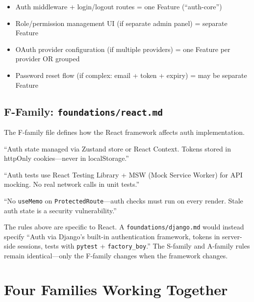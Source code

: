 \documentclass[11pt,a4paper,openright,twoside]{report}
\newcommand{\file}[1]{\texttt{#1}}
\begin{document}
\begin{itemize}[nosep]
  \item Auth middleware + login/logout routes = one Feature (``auth-core'')
  \item Role/permission management UI (if separate admin panel) = separate Feature
  \item OAuth provider configuration (if multiple providers) = one Feature per provider OR grouped
  \item Password reset flow (if complex: email + token + expiry) = may be separate Feature
\end{itemize}

\subsection{F-Family: \file{foundations/react.md}}

The F-family file defines how the React framework affects auth implementation.

\begin{description}[style=nextline, leftmargin=1.8cm, labelwidth=1.4cm]
  \item[F3 --- Implement-time Rules]
  ``Auth state managed via Zustand store or React Context. Tokens stored in httpOnly cookies---never in localStorage.''

  \item[F4 --- Toolchain Commands]
  ``Auth tests use React Testing Library + MSW (Mock Service Worker) for API mocking. No real network calls in unit tests.''

  \item[F7 --- Philosophy]
  ``No \texttt{useMemo} on \texttt{ProtectedRoute}---auth checks must run on every render. Stale auth state is a security vulnerability.''
\end{description}

\begin{warnbox}
The rules above are specific to React. A \file{foundations/django.md} would instead specify ``Auth via Django's built-in authentication framework, tokens in server-side sessions, tests with \texttt{pytest} + \texttt{factory\_boy}.'' The S-family and A-family rules remain identical---only the F-family changes when the framework changes.
\end{warnbox}


\section{Four Families Working Together}
\label{sec:families-collaboration}
\end{document}
